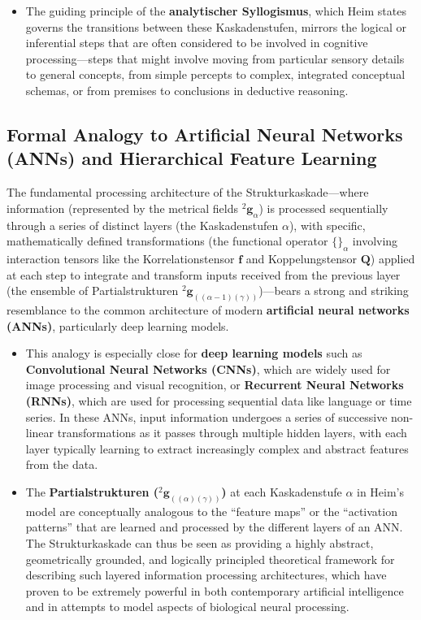 \documentclass[
    12pt,              %
    a4paper,           %
    headings=normal,   %
    twoside=true,      %
    BCOR=8mm,          %
]{scrbook}
\newcommand{\q}[1]{\enquote{#1}}
\newcommand{\kompositionsfeld}{{}^2\mathbf{g}}
\newcommand{\partialstruktur}[1]{{}^2\mathbf{g}_{(#1)}}
\newcommand{\korrelationstensor}{\mathbf{f}}
\newcommand{\koppelungstensor}{\mathbf{Q}}
\newcommand{\kaskadenstufe}{\alpha}
\begin{document}
\begin{itemize}
\begin{enumerate}[label=\arabic*.]
        \end{enumerate}
    \item   The guiding principle of the \textbf{analytischer Syllogismus}, which Heim states governs the transitions between these Kaskadenstufen, mirrors the logical or inferential steps that are often considered to be involved in cognitive processing—steps that might involve moving from particular sensory details to general concepts, from simple percepts to complex, integrated conceptual schemas, or from premises to conclusions in deductive reasoning.
\end{itemize}

\subsection{Formal Analogy to Artificial Neural Networks (ANNs) and Hierarchical Feature Learning}
\label{sec:ch9_4_2_analogy_ann}
The fundamental processing architecture of the Strukturkaskade—where information (represented by the metrical fields \(\kompositionsfeld_\alpha\)) is processed sequentially through a series of distinct layers (the Kaskadenstufen \(\kaskadenstufe\)), with specific, mathematically defined transformations (the functional operator \(\{\}_\alpha\) involving interaction tensors like the Korrelationstensor \(\korrelationstensor\) and Koppelungstensor \(\koppelungstensor\)) applied at each step to integrate and transform inputs received from the previous layer (the ensemble of Partialstrukturen \(\partialstruktur{(\alpha-1)(\gamma)}\))—bears a strong and striking resemblance to the common architecture of modern \textbf{artificial neural networks (ANNs)}, particularly deep learning models.
\begin{itemize}
    \item   This analogy is especially close for \textbf{deep learning models} such as \textbf{Convolutional Neural Networks (CNNs)}, which are widely used for image processing and visual recognition, or \textbf{Recurrent Neural Networks (RNNs)}, which are used for processing sequential data like language or time series. In these ANNs, input information undergoes a series of successive non-linear transformations as it passes through multiple hidden layers, with each layer typically learning to extract increasingly complex and abstract features from the data.
    \item   The \textbf{Partialstrukturen (\(\partialstruktur{(\alpha)(\gamma)}\))} at each Kaskadenstufe \(\kaskadenstufe\) in Heim’s model are conceptually analogous to the \q{feature maps} or the \q{activation patterns} that are learned and processed by the different layers of an ANN. The Strukturkaskade can thus be seen as providing a highly abstract, geometrically grounded, and logically principled theoretical framework for describing such layered information processing architectures, which have proven to be extremely powerful in both contemporary artificial intelligence and in attempts to model aspects of biological neural processing.
\end{itemize}
\end{document}
